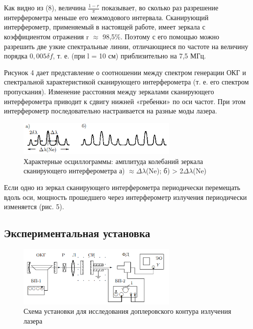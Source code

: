 \documentclass[12pt,a4paper]{article}
\begin{document}
\par Как видно из (8), величина $\frac{1-r}{\pi}$ показывает, во сколько раз разрешение интерферометра меньше его межмодового интервала. Сканирующий интерферометр, применяемый в настоящей работе, имеет зеркала с коэффициентом отражения r $\approx$ 98,5\%. Поэтому с его помощью можно разрешить две узкие спектральные линии, отличающиеся по частоте на величину порядка $0,005\delta{f}$, т. е. (при l = 10 см) приблизительно на 7,5 МГц. 

\par Рисунок 4 дает представление о соотношении между спектром генерации ОКГ и спектральной характеристикой сканирующего интерферометра (т. е. его спектром пропускания). Изменение расстояния между зеркалами сканирующего интерферометра приводит
к сдвигу нижней «гребенки» по оси частот. При этом интерферометр последовательно настраивается на разные моды лазера.

	\begin{figure}[h!]
		\begin{center}
			\includegraphics[width = 0.7\textwidth]{4.5.3-5}
			\caption{Характерные осциллограммы: амплитуда колебаний зеркала сканирующего интерферометра а) $\approx \Delta\lambda$(Ne); б) > 2$\Delta\lambda$(Ne)}
		\end{center}
	\end{figure}

\par Если одно из зеркал сканирующего интерферометра периодически
перемещать вдоль оси, мощность прошедшего через интерферометр излучения периодически изменяется (рис. 5).

\newpage
\subsection{Экспериментальная установка}

\begin{figure}[h!]
		\begin{center}
			\includegraphics[width = 0.7\textwidth]{4.5.3-6}
			\caption{Схема установки для исследования доплеровского контура излучения лазера}
		\end{center}
	\end{figure}
\end{document}
